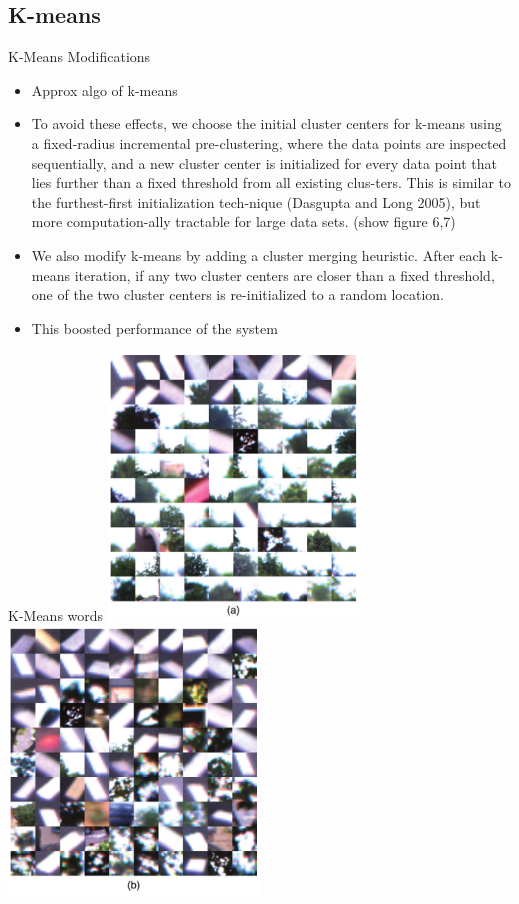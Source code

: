 \subsection{K-means}
\begin{frame}{K-Means Modifications}
    \begin{itemize}
        \item Approx algo of k-means
        \item To avoid these effects, we choose the initial cluster centers for k-means using a fixed-radius incremental pre-clustering, where the data points are inspected sequentially, and a new cluster center is initialized for every data point that lies further than a fixed threshold from all existing clus-ters. This is similar to the furthest-first initialization tech-nique (Dasgupta and Long 2005), but more computation-ally tractable for large data sets. (show figure 6,7)
        \item We also modify k-means by adding a cluster merging heuristic. After each k-means iteration, if any two cluster centers are closer than a fixed threshold, one of the two cluster centers is re-initialized to a random location.
        \item This boosted performance of the system
    \end{itemize}
\end{frame}

\begin{frame}{K-Means words}
    \includegraphics[width=0.5\textwidth]{./media/words_fabmap2a.png}
    \includegraphics[width=0.5\textwidth]{./media/words_fabmap2b.png}
\end{frame}

